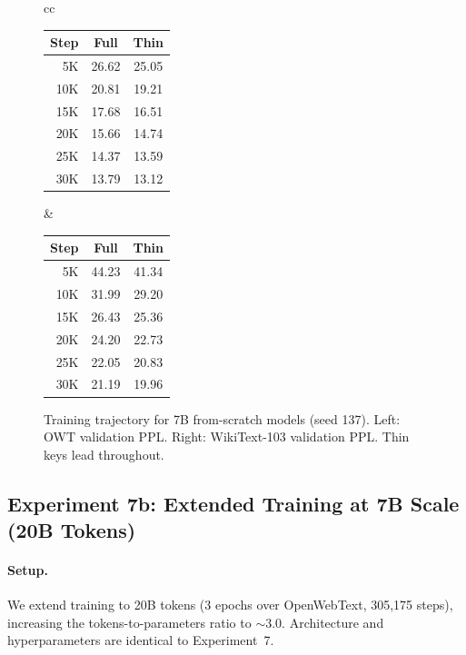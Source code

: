 \documentclass{article} %
\begin{document}
\begin{figure}[h]
\centering
\begin{tabular}{cc}
\small
\begin{tabular}{rcc}
\toprule
Step & Full & Thin \\
\midrule
5K  & 26.62 & 25.05 \\
10K & 20.81 & 19.21 \\
15K & 17.68 & 16.51 \\
20K & 15.66 & 14.74 \\
25K & 14.37 & 13.59 \\
30K & 13.79 & 13.12 \\
\bottomrule
\end{tabular}
&
\small
\begin{tabular}{rcc}
\toprule
Step & Full & Thin \\
\midrule
5K  & 44.23 & 41.34 \\
10K & 31.99 & 29.20 \\
15K & 26.43 & 25.36 \\
20K & 24.20 & 22.73 \\
25K & 22.05 & 20.83 \\
30K & 21.19 & 19.96 \\
\bottomrule
\end{tabular}
\end{tabular}
\caption{Training trajectory for 7B from-scratch models (seed 137). Left: OWT validation PPL. Right: WikiText-103 validation PPL. Thin keys lead throughout.}
\label{fig:7b_trajectory}
\end{figure}


\subsection{Experiment 7b: Extended Training at 7B Scale (20B Tokens)}\label{sec:exp7b}

\paragraph{Setup.}
We extend training to 20B tokens (3 epochs over OpenWebText, 305{,}175 steps), increasing the tokens-to-parameters ratio to $\sim$3.0. Architecture and hyperparameters are identical to Experiment~7.
\end{document}
